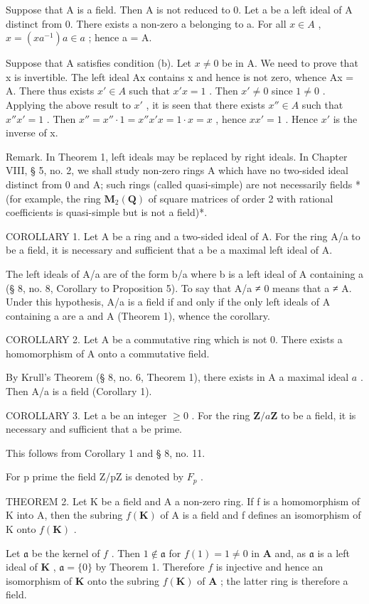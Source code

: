 Suppose that A is a field. Then A is not reduced to 0. Let a be a left ideal of A distinct from 0. There exists a non-zero a belonging to a. For all \(x \in A\) , \(x = (xa^{-1})a \in a\) ; hence a = A.

Suppose that A satisfies condition (b). Let \(x \neq 0\) be in A. We need to prove that x is invertible. The left ideal Ax contains x and hence is not zero, whence Ax = A. There thus exists \(x' \in A\) such that \(x'x = 1\) . Then \(x' \neq 0\) since \(1 \neq 0\) . Applying the above result to \(x'\) , it is seen that there exists \(x'' \in A\) such that \(x''x' = 1\) . Then \(x'' = x'' \cdot 1 = x''x'x = 1 \cdot x = x\) , hence \(xx' = 1\) . Hence \(x'\) is the inverse of x.

Remark. In Theorem 1, left ideals may be replaced by right ideals. In Chapter VIII, § 5, no. 2, we shall study non-zero rings A which have no two-sided ideal distinct from 0 and A; such rings (called quasi-simple) are not necessarily fields * (for example, the ring \(\mathbf{M}_2(\mathbf{Q})\) of square matrices of order 2 with rational coefficients is quasi-simple but is not a field)*.

COROLLARY 1. Let A be a ring and a two-sided ideal of A. For the ring A/a to be a field, it is necessary and sufficient that a be a maximal left ideal of A.

The left ideals of A/a are of the form b/a where b is a left ideal of A containing a (§ 8, no. 8, Corollary to Proposition 5). To say that A/a ≠ 0 means that a ≠ A. Under this hypothesis, A/a is a field if and only if the only left ideals of A containing a are a and A (Theorem 1), whence the corollary.

COROLLARY 2. Let A be a commutative ring which is not 0. There exists a homomorphism of A onto a commutative field.

By Krull's Theorem (§ 8, no. 6, Theorem 1), there exists in A a maximal ideal \(a\) . Then A/a is a field (Corollary 1).

COROLLARY 3. Let a be an integer \(\geqslant 0\) . For the ring \(\mathbf{Z} / a\mathbf{Z}\) to be a field, it is necessary and sufficient that a be prime.

This follows from Corollary 1 and § 8, no. 11.

For p prime the field Z/pZ is denoted by \(F_{p}\) .

THEOREM 2. Let K be a field and A a non-zero ring. If f is a homomorphism of K into A, then the subring \(f(\mathbf{K})\) of A is a field and f defines an isomorphism of K onto \(f(\mathbf{K})\) .

Let \(\mathfrak{a}\) be the kernel of \(f\) . Then \(1 \notin \mathfrak{a}\) for \(f(1) = 1 \neq 0\) in \(\mathbf{A}\) and, as \(\mathfrak{a}\) is a left ideal of \(\mathbf{K}\) , \(\mathfrak{a} = \{0\}\) by Theorem 1. Therefore \(f\) is injective and hence an isomorphism of \(\mathbf{K}\) onto the subring \(f(\mathbf{K})\) of \(\mathbf{A}\) ; the latter ring is therefore a field.

